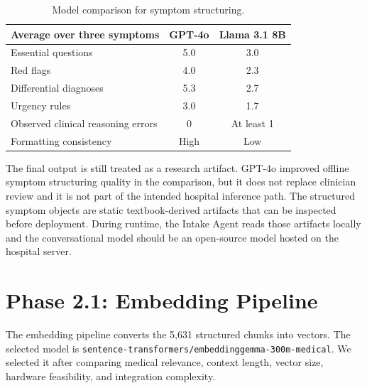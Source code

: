 \begin{table}[htbp]
\centering
\caption{Model comparison for symptom structuring.}
\label{tab:symptom_model_comparison}
\begin{tabular}{p{} c c}
\toprule
\textbf{Average over three symptoms} & \textbf{GPT-4o} & \textbf{Llama 3.1 8B}\\
\midrule
Essential questions & 5.0 & 3.0\\
Red flags & 4.0 & 2.3\\
Differential diagnoses & 5.3 & 2.7\\
Urgency rules & 3.0 & 1.7\\
Observed clinical reasoning errors & 0 & At least 1\\
Formatting consistency & High & Low\\
\bottomrule
\end{tabular}
\end{table}

The final output is still treated as a research artifact. GPT-4o improved offline symptom structuring quality in the comparison, but it does not replace clinician review and it is not part of the intended hospital inference path. The structured symptom objects are static textbook-derived artifacts that can be inspected before deployment. During runtime, the Intake Agent reads those artifacts locally and the conversational model should be an open-source model hosted on the hospital server.

\section{Phase 2.1: Embedding Pipeline}

The embedding pipeline converts the 5,631 structured chunks into vectors. The selected model is \texttt{sentence-transformers/embeddinggemma-300m-medical}. We selected it after comparing medical relevance, context length, vector size, hardware feasibility, and integration complexity.


